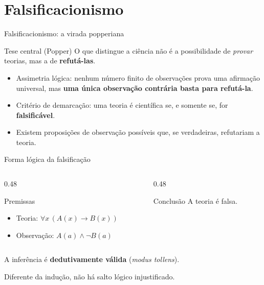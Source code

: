 \documentclass[aspectratio=169]{beamer}
\newcommand{\impt}[1]{\textcolor{maccent}{\textbf{#1}}}
\newcommand{\ntc}[1]{\textcolor{mprimary}{#1}}
\begin{document}
\section{Falsificacionismo}

\begin{frame}{Falsificacionismo: a virada popperiana}
\begin{block}{Tese central (Popper)}
O que distingue a ci\^encia n\~ao \'e a possibilidade de \emph{provar} teorias, mas a de \impt{refut\'a-las}.
\end{block}
\vspace{0.2cm}
\begin{itemize}
    \item \ntc{Assimetria l\'ogica}: nenhum n\'umero finito de observa\c c\~oes prova uma afirma\c c\~ao universal, mas \impt{uma \'unica observa\c c\~ao contr\'aria basta para refut\'a-la}.
    \item \ntc{Crit\'erio de demarca\c c\~ao}: uma teoria \'e cient\'ifica se, e somente se, for \impt{falsific\'avel}.
    \item Existem proposi\c c\~oes de observa\c c\~ao poss\'iveis que, se verdadeiras, refutariam a teoria.
\end{itemize}
\end{frame}

\begin{frame}{Forma l\'ogica da falsifica\c c\~ao}
\begin{columns}[T]
\begin{column}{0.48\textwidth}
\begin{block}{Premissas}
\begin{itemize}
    \item[(1)] Teoria: $\forall x\,(A(x) \rightarrow B(x))$
    \item[(2)] Observa\c c\~ao: $A(a) \land \lnot B(a)$
\end{itemize}
\end{block}
\end{column}
\begin{column}{0.48\textwidth}
\begin{alertblock}{Conclus\~ao}
A teoria \'e falsa.
\end{alertblock}
\end{column}
\end{columns}
\vspace{0.4cm}
\begin{center}
A infer\^encia \'e \impt{dedutivamente v\'alida} (\textit{modus tollens}).
\vspace{0.2cm}

Diferente da indu\c c\~ao, n\~ao h\'a salto l\'ogico injustificado.
\end{center}
\end{frame}
\end{document}
